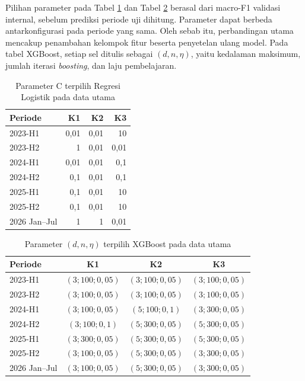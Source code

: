 Pilihan parameter pada Tabel \ref{tab:hasil-parameter-logistik} dan Tabel \ref{tab:hasil-parameter-xgboost} berasal dari macro-F1 validasi internal, sebelum prediksi periode uji dihitung. Parameter dapat berbeda antarkonfigurasi pada periode yang sama. Oleh sebab itu, perbandingan utama mencakup penambahan kelompok fitur beserta penyetelan ulang model. Pada tabel XGBoost, setiap sel ditulis sebagai $(d,n,\eta)$, yaitu kedalaman maksimum, jumlah iterasi \emph{boosting}, dan laju pembelajaran.


\begin{table}[htbp]
\centering
\small
\setlength{\tabcolsep}{4pt}
\caption{Parameter C terpilih Regresi Logistik pada data utama}
\label{tab:hasil-parameter-logistik}
\begin{tabular}{lrrr}
\toprule
Periode & K1 & K2 & K3 \\
\midrule
2023-H1 & 0,01 & 0,01 & 10 \\
2023-H2 & 1 & 0,01 & 0,01 \\
2024-H1 & 0,01 & 0,01 & 0,1 \\
2024-H2 & 0,1 & 0,01 & 0,1 \\
2025-H1 & 0,1 & 0,01 & 10 \\
2025-H2 & 0,1 & 0,01 & 10 \\
2026 Jan--Jul & 1 & 1 & 0,01 \\
\bottomrule
\end{tabular}
\end{table}


\begin{table}[htbp]
\centering
\small
\setlength{\tabcolsep}{4pt}
\caption{Parameter $(d,n,\eta)$ terpilih XGBoost pada data utama}
\label{tab:hasil-parameter-xgboost}
\begin{tabular}{lccc}
\toprule
Periode & K1 & K2 & K3 \\
\midrule
2023-H1 & $( 3; 100; 0{,}05)$ & $( 3; 100; 0{,}05)$ & $( 3; 100; 0{,}05)$ \\
2023-H2 & $( 3; 100; 0{,}05)$ & $( 3; 100; 0{,}05)$ & $( 3; 100; 0{,}05)$ \\
2024-H1 & $( 3; 100; 0{,}05)$ & $( 5; 100; 0{,}1)$ & $( 3; 300; 0{,}05)$ \\
2024-H2 & $( 3; 100; 0{,}1)$ & $( 5; 300; 0{,}05)$ & $( 5; 300; 0{,}05)$ \\
2025-H1 & $( 3; 300; 0{,}05)$ & $( 5; 300; 0{,}05)$ & $( 5; 300; 0{,}05)$ \\
2025-H2 & $( 3; 100; 0{,}05)$ & $( 5; 300; 0{,}05)$ & $( 3; 300; 0{,}05)$ \\
2026 Jan--Jul & $( 3; 100; 0{,}05)$ & $( 5; 300; 0{,}05)$ & $( 3; 300; 0{,}05)$ \\
\bottomrule
\end{tabular}
\end{table}


